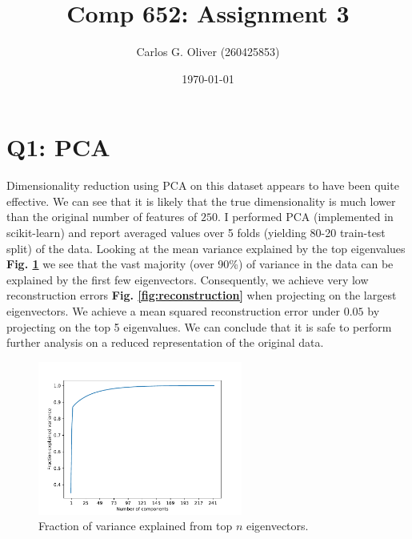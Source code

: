 \documentclass[11pt]{amsart}
\title{Comp 652: Assignment 3}
\author{Carlos G. Oliver (260425853)}
\date{\today}                                           %
\begin{document}
\maketitle



\section{Q1: PCA}

Dimensionality reduction using PCA on this dataset appears to have been quite effective. We can see that it is likely that the true dimensionality is much lower than the original number of features of $250$. I performed PCA (implemented in scikit-learn) and report averaged values over 5 folds (yielding 80-20 train-test split) of the data. Looking at the mean variance explained by the top eigenvalues {\bf Fig. \ref{fig:var}} we see that the vast majority (over 90\%) of variance in the data can be explained by the first few eigenvectors. Consequently, we achieve very low reconstruction errors {\bf Fig. \ref{fig:reconstruction}} when projecting on the largest eigenvectors. We achieve a mean squared reconstruction error under $0.05$ by projecting on the top 5 eigenvalues. We can conclude that it is safe to perform further analysis on a reduced representation of the original data.


\begin{figure}[h!]
\includegraphics[width=0.6\textwidth]{var.pdf}
\caption{Fraction of variance explained from top $n$ eigenvectors.}
\label{fig:var}
\end{figure}
\end{document}
